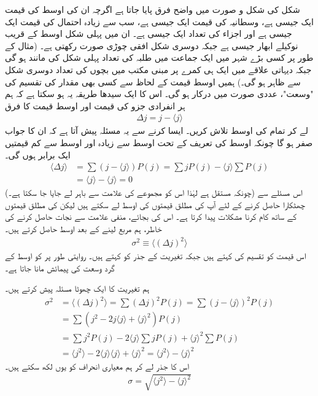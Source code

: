 شکل  کی شکل و صورت  میں واضح فرق پایا جاتا ہے اگرچہ ان کی اوسط کی قیمت ایک جیسی ہے، وسطانیہ کی قیمت  ایک جیسی ہے،  سب سے زیادہ  احتمال کی    قیمت ایک جیسی ہے   اور اجزاء کی تعداد ایک جیسی ہے۔ ان میں پہلی شکل اوسط کے قریب نوکیلے   ابھار جیسی  ہے جبکہ دوسری شکل  افقی چوڑی  صورت رکھتی ہے۔ (مثال کے طور پر کسی بڑے شہر میں ایک جماعت میں طلبہ  کی تعداد پہلی شکل کی   مانند ہو گی جبکہ دیہاتی علاقے    میں ایک ہی کمرے  پر مبنی مکتب  میں بچوں کی تعداد دوسری شکل سے  ظاہر ہو گی۔) ہمیں اوسط قیمت کے لحاظ سے کسی بھی مقدار کی تقسیم کی "وسعت"، عددی صورت میں درکار ہو گی۔ اس کا ایک سیدھا طریقہ یہ ہو سکتا ہے کہ ہم ہر انفرادی جزو کی قیمت اور اوسط قیمت کا فرق
\begin{align}
\Delta j = j-\langle j \rangle 
\end{align}
لے کر  تمام  کی اوسط تلاش کریں۔ ایسا کرنے سے یہ مسئلہ پیش آتا ہے کہ ان کا جواب صفر ہو گا چونکہ اوسط کی تعریف کے تحت اوسط سے زیادہ اور اوسط سے کم قیمتیں ایک برابر ہوں گی۔ 
\begin{align*}
\langle \Delta j \rangle &= \sum \left( j -  \langle j \rangle  \right) P(j) = \sum jP(j) - \langle j \rangle \sum P(j) \\
 &= \langle j \rangle - \langle j \rangle = 0
\end{align*}
(چونکہ    مستقل ہے لہٰذا اس کو مجموعے  کی علامت سے باہر لے جایا جا سکتا ہے۔) اس مسئلے سے چھٹکارا حاصل کرنے کے لئے   آپ      کی مطلق قیمتوں کی  اوسط لے سکتے ہیں لیکن     کی مطلق قیمتوں  کے ساتھ کام کرنا مشکلات پیدا کرتا ہے۔ اس کی بجائے، منفی علامت سے نجات حاصل کرنے کی خاطر، ہم مربع لینے کے بعد اوسط حاصل کرتے ہیں۔
\begin{align} \label{مساوات_تفاعل_موج_تعریف_معیاری_احتمال_الف}
 \sigma^{2} \equiv \langle \left( \Delta j \right)^{2} \rangle 
\end{align}
اس قیمت کو تقسیم کی  کہتے ہیں جبکہ تغیریت کے جذر   کو  کہتے ہیں۔ روایتی طور پر   کو اوسط   کے گرد  وسعت  کی پیمائش  مانا جاتا ہے۔

 ہم تغیریت کا ایک چھوٹا مسئلہ پیش کرتے ہیں۔ 
\begin{align*}
\sigma^{2} &= \langle ( \Delta j )^{2} \rangle = \sum ( \Delta j )^{2} P(j) = \sum (j- \langle j \rangle )^{2} P(j) \\
&= \sum (j^{2} -2j \langle j \rangle + \langle j \rangle ^{2} ) P(j) \\ 
&= \sum j^{2} P(j) -2 \langle j \rangle \sum jP(j) + \langle j \rangle ^{2} \sum P(j) \\ 
&= \langle j^{2}\rangle -2\langle j \rangle \langle j \rangle + \langle j \rangle ^{2} = \langle j^{2} \rangle - \langle j \rangle ^{2}
\end{align*}
اس کا جذر لے کر ہم معیاری انحراف کو    یوں  لکھ سکتے ہیں۔ 
\begin{align}\label{مساوات_تفاعل_موج_تعریف_معیاری_احتمال_ب}
 \sigma = \sqrt{\langle j^{2} \rangle - \langle j \rangle ^{2}} 
\end{align}


